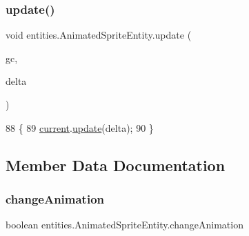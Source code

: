 \subsubsection{\texorpdfstring{update()}{update()}}
{\footnotesize\ttfamily void entities.\+Animated\+Sprite\+Entity.\+update (\begin{DoxyParamCaption}\item[{\mbox{\hyperlink{classorg_1_1newdawn_1_1slick_1_1_game_container}{Game\+Container}}}]{gc,  }\item[{long}]{delta }\end{DoxyParamCaption})\hspace{0.3cm}{\ttfamily [inline]}}


\begin{DoxyCode}
88                                                      \{
89         \mbox{\hyperlink{classentities_1_1_animated_sprite_entity_ab44999a4be67c7ce81f4da6b5d333ce5}{current}}.\mbox{\hyperlink{classorg_1_1newdawn_1_1slick_1_1_animation_a24420dcd4e89ff617ed52a265e014ba5}{update}}(delta);
90     \}
\end{DoxyCode}


\subsection{Member Data Documentation}
\mbox{\label{classentities_1_1_animated_sprite_entity_ac5b06797e6a716cb04b883d92301fabf}} 
\subsubsection{\texorpdfstring{change\+Animation}{changeAnimation}}
{\footnotesize\ttfamily boolean entities.\+Animated\+Sprite\+Entity.\+change\+Animation\hspace{0.3cm}{\ttfamily [private]}}

\mbox{\label{classentities_1_1_animated_sprite_entity_ab44999a4be67c7ce81f4da6b5d333ce5}} 

